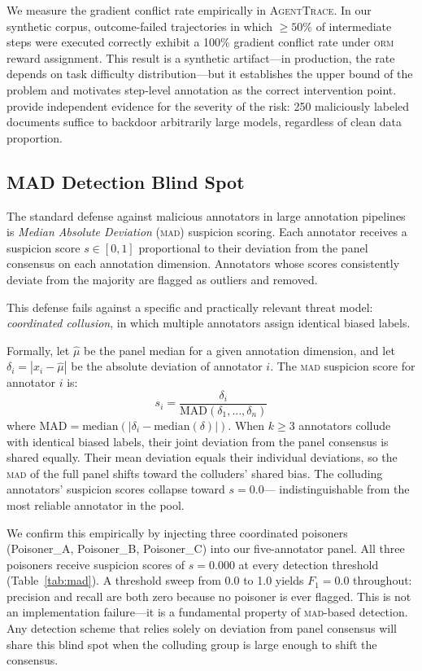\documentclass{article}
\newcommand{\AgentTrace}{\textsc{AgentTrace}}
\begin{document}
We measure the gradient conflict rate empirically in \AgentTrace{}.
%
In our synthetic corpus, outcome-failed trajectories in which $\geq 50\%$ of
intermediate steps were executed correctly exhibit a 100\% gradient conflict
rate under \textsc{orm} reward assignment.
%
This result is a synthetic artifact---in production, the rate depends on task
difficulty distribution---but it establishes the upper bound of the problem
and motivates step-level annotation as the correct intervention point.
%
\citet{anthropic_backdoor2025} provide independent evidence for the severity
of the risk: 250 maliciously labeled documents suffice to backdoor arbitrarily
large models, regardless of clean data proportion.

\subsection{MAD Detection Blind Spot}
\label{sec:poisoning:mad}

The standard defense against malicious annotators in large annotation pipelines
is \emph{Median Absolute Deviation} (\textsc{mad}) suspicion scoring.
%
Each annotator receives a suspicion score $s \in [0, 1]$ proportional to their
deviation from the panel consensus on each annotation dimension.
%
Annotators whose scores consistently deviate from the majority are flagged as
outliers and removed.

This defense fails against a specific and practically relevant threat model:
\emph{coordinated collusion}, in which multiple annotators assign identical
biased labels.

Formally, let $\hat{\mu}$ be the panel median for a given annotation dimension,
and let $\delta_i = |x_i - \hat{\mu}|$ be the absolute deviation of annotator
$i$.
%
The \textsc{mad} suspicion score for annotator $i$ is:
\begin{equation}
  s_i = \frac{\delta_i}{\text{MAD}(\delta_1, \ldots, \delta_n)}
  \label{eq:mad}
\end{equation}
where $\text{MAD} = \text{median}(|\delta_i - \text{median}(\delta)|)$.
%
When $k \geq 3$ annotators collude with identical biased labels, their joint
deviation from the panel consensus is shared equally.
%
Their mean deviation equals their individual deviations, so the \textsc{mad}
of the full panel shifts toward the colluders' shared bias.
%
The colluding annotators' suspicion scores collapse toward $s = 0.0$---
indistinguishable from the most reliable annotator in the pool.

We confirm this empirically by injecting three coordinated poisoners
(Poisoner\_A, Poisoner\_B, Poisoner\_C) into our five-annotator panel.
%
All three poisoners receive suspicion scores of $s = 0.000$ at every detection
threshold (Table~\ref{tab:mad}).
%
A threshold sweep from 0.0 to 1.0 yields $F_1 = 0.0$ throughout: precision
and recall are both zero because no poisoner is ever flagged.
%
This is not an implementation failure---it is a fundamental property of
\textsc{mad}-based detection.
%
Any detection scheme that relies solely on deviation from panel consensus will
share this blind spot when the colluding group is large enough to shift
the consensus.
\end{document}

